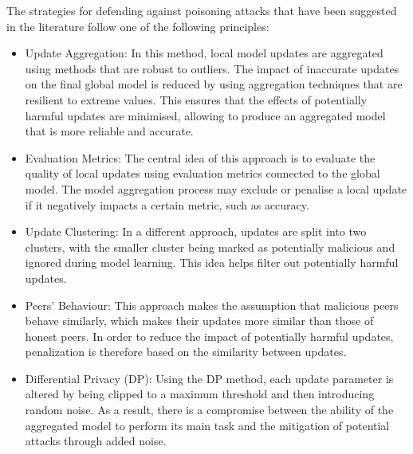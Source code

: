 The strategies for defending against poisoning attacks that have been suggested in the literature follow one of the following principles:
\begin{itemize}
        \item Update Aggregation: In this method, local model updates are aggregated using methods that are robust to outliers. The impact of inaccurate updates on the final global model is reduced by using aggregation techniques that are resilient to extreme values. This ensures that the effects of potentially harmful updates are minimised, allowing to produce an aggregated model that is more reliable and accurate.
        \item Evaluation Metrics: The central idea of this approach is to evaluate the quality of local updates using evaluation metrics connected to the global model. The model aggregation process may exclude or penalise a local update if it negatively impacts a certain metric, such as accuracy.
        \item Update Clustering: In a different approach, updates are split into two clusters, with the smaller cluster being marked as potentially malicious and ignored during model learning. This idea helps filter out potentially harmful updates.
        \item Peers' Behaviour: This approach makes the assumption that malicious peers behave similarly, which makes their updates more similar than those of honest peers. In order to reduce the impact of potentially harmful updates, penalization is therefore based on the similarity between updates.
        \item Differential Privacy (DP): Using the DP method, each update parameter is altered by being clipped to a maximum threshold and then introducing random noise. As a result, there is a compromise between the ability of the aggregated model to perform its main task and the mitigation of potential attacks through added noise.
\end{itemize}

